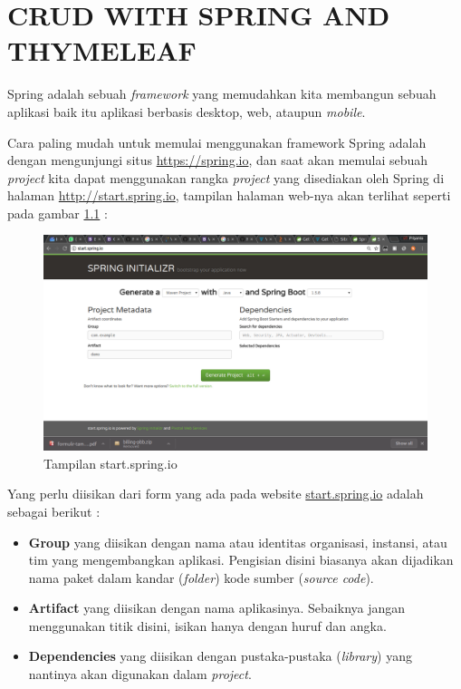\chapter{CRUD WITH SPRING AND THYMELEAF}

Spring adalah sebuah \textit{framework} yang memudahkan kita membangun sebuah aplikasi baik itu aplikasi berbasis desktop, web, ataupun \textit{mobile}.

Cara paling mudah untuk memulai menggunakan framework Spring adalah dengan mengunjungi situs \url{https://spring.io}, dan saat akan memulai sebuah \textit{project} kita dapat menggunakan rangka \textit{project} yang disediakan oleh Spring di halaman \url{http://start.spring.io}, tampilan halaman web-nya akan terlihat seperti pada gambar \ref{fig:start-spring} :

\begin{figure}[H]
	\centering
	\includegraphics[width=1\textwidth]{./resources/001-tampilan-start-spring}
	\caption{Tampilan start.spring.io}
	\label{fig:start-spring}
\end{figure}

Yang perlu diisikan dari form yang ada pada website \url{start.spring.io} adalah sebagai berikut :

\begin{itemize}
	\item \textbf{Group} yang diisikan dengan nama atau identitas organisasi, instansi, atau tim yang mengembangkan aplikasi. Pengisian disini biasanya akan dijadikan nama paket dalam kandar (\textit{folder}) kode sumber (\textit{source code}).
	\item \textbf{Artifact} yang diisikan dengan nama aplikasinya. Sebaiknya jangan menggunakan titik disini, isikan hanya dengan huruf dan angka.
	\item \textbf{Dependencies} yang diisikan dengan pustaka-pustaka (\textit{library}) yang nantinya akan digunakan dalam \textit{project}.
\end{itemize}

